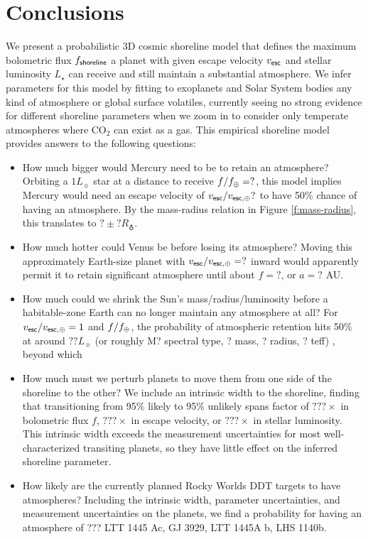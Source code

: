 \documentclass[modern,linenumbers,trackchanges]{aastex7}
\newcommand{\todo}[1]{{\color{orange}  #1 \normalfont}}
\begin{document}
\section{Conclusions}
\label{s:conclusions}

We present a probabilistic 3D cosmic shoreline model that defines the maximum bolometric flux $f_{\sf shoreline}$ a planet with given escape velocity $v_{\sf esc}$ and stellar luminosity $L_\star$ can receive and still maintain a substantial atmosphere. We infer parameters for this model by fitting to exoplanets and Solar System bodies any kind of atmosphere or global surface volatiles, currently seeing no strong evidence for different shoreline parameters when we zoom in to consider only temperate atmospheres where CO$_2$ can exist as a gas. This empirical shoreline model provides answers to the following questions:
\begin{itemize}
\item How much bigger would Mercury need to be to retain an atmosphere? Orbiting a $1L_\sun$ star at a distance to receive $f/f_\oplus = ? $, this model implies Mercury would need an escape velocity of $v_{\sf esc}/v_{\sf esc, \oplus} ?$ to have 50\% chance of having an atmosphere. By the mass-radius relation in Figure \ref{f:mass-radius}, this translates to $? \pm ?R_\earth$. 

\item How much hotter could Venus be before losing its atmosphere? Moving this approximately Earth-size planet with $v_{\sf esc}/v_{\sf esc, \oplus} = ?$ inward would apparently permit it to retain significant atmosphere until about $f = ?$, or $a = ?$ AU.

\item How much could we shrink the Sun's mass/radius/luminosity before a habitable-zone Earth can no longer maintain any atmosphere at all? For $v_{\sf esc}/v_{\sf esc, \oplus} = 1$ and $f/f_\oplus$, the probability of atmospheric retention hits 50\% at around $?? L_\sun$ \todo{(or roughly M? spectral type, ? mass, ? radius, ? teff)}, beyond which 

\item How much must we perturb planets to move them from one side of the shoreline to the other? We include an intrinsic width to the shoreline, finding that transitioning from 95\% likely to 95\% unlikely spans factor of $???\times$ in bolometric flux $f$, $???\times$ in escape velocity, or $???\times$ in stellar luminosity. This intrinsic width exceeds the measurement uncertainties for most well-characterized transiting planets, so they have little effect on the inferred shoreline parameter.

\item How likely are the currently planned Rocky Worlds DDT targets to have atmospheres? Including the intrinsic width, parameter uncertainties, and measurement uncertainties on the planets, we find a probability for having an atmosphere of ??? LTT 1445 Ac, GJ 3929, LTT 1445A b, LHS 1140b.
\end{itemize}
\end{document}
